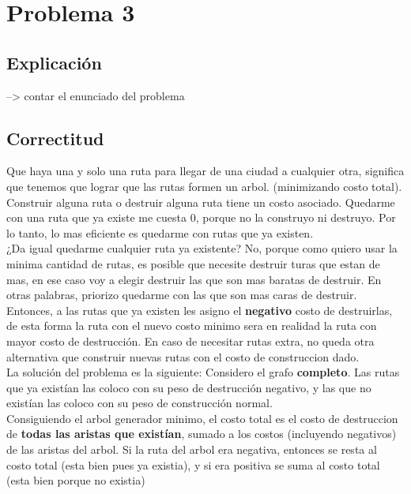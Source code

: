 \section{Problema 3}
\subsection{Explicación}

--> contar el enunciado del problema

\subsection{Correctitud}

Que haya una y solo una ruta para llegar de una ciudad a cualquier otra, significa que tenemos que lograr que las rutas formen un arbol. (minimizando costo total). Construir alguna ruta o destruir alguna ruta tiene un costo asociado. Quedarme con una ruta que ya existe me cuesta 0, porque no la construyo ni destruyo. Por lo tanto, lo mas eficiente es quedarme con rutas que ya existen. \\

¿Da igual quedarme cualquier ruta ya existente? No, porque como quiero usar la minima cantidad de rutas, es posible que necesite destruir turas que estan de mas, en ese caso voy a elegir destruir las que son mas baratas de destruir. En otras palabras, priorizo quedarme con las que son mas caras de destruir. \\

Entonces, a las rutas que ya existen les asigno el \textbf{negativo} costo de destruirlas, de esta forma la ruta con el nuevo costo minimo sera en realidad la ruta con mayor costo de destrucción. En caso de necesitar rutas extra, no queda otra alternativa que construir nuevas rutas con el costo de construccion dado. \\

La solución del problema es la siguiente:
Considero el grafo \textbf{completo}. Las rutas que ya existían las coloco con su peso de destrucción negativo, y las que no existían las coloco con su peso de construcción normal. \\

Consiguiendo el arbol generador minimo, el costo total es el costo de destruccion de \textbf{todas las aristas que existían}, sumado a los costos (incluyendo negativos) de las aristas del arbol. Si la ruta del arbol era negativa, entonces se resta al costo total (esta bien pues ya existia), y si era positiva se suma al costo total (esta bien porque no existia) \\



